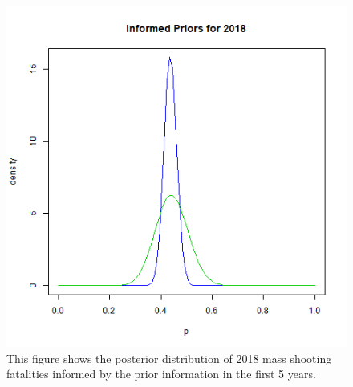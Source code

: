 \documentclass{article}
\begin{document}
\begin{figure}[!h]
    \centering
    \includegraphics[scale=.5]{Figure8.png}
    \caption{This figure shows the posterior distribution of 2018 mass shooting fatalities informed by the prior information in the first 5 years.}
    \label{fig:8}
\end{figure}

 
\end{document}
